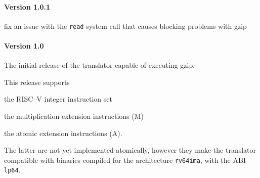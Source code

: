 \paragraph{Version 1.0.1}
\begin{itemize*}
 	\item fix an issue with the \texttt{read} system call that causes blocking problems with gzip
\end{itemize*}


\paragraph{Version 1.0}
The initial release of the translator capable of executing gzip.

This release supports
\begin{itemize*}
 	\item the RISC--V integer instruction set
 	\item the multiplication extension instructions (M)
 	\item the atomic extension instructions (A).
\end{itemize*}

The latter are not yet implemented atomically, however they make the translator compatible with binaries compiled for the architecture \texttt{rv64ima}, with the ABI \texttt{lp64}.



